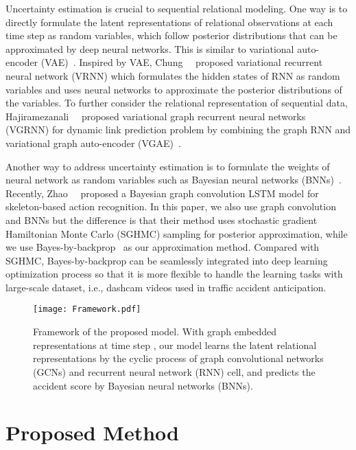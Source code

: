 \documentclass[sigconf]{acmart}
\begin{document}
Uncertainty estimation is crucial to sequential relational modeling. One way is to directly formulate the latent representations of relational observations at each time step as random variables, which follow posterior distributions that can be approximated by deep neural networks. This is similar to variational auto-encoder (VAE)~\cite{KingmaICLR2014,RezendeICML2014}. Inspired by VAE, Chung~\etal~\cite{ChungNIPS2015} proposed variational recurrent neural network (VRNN) which formulates the hidden states of RNN as random variables and uses neural networks to approximate the posterior distributions of the variables. To further consider the relational representation of sequential data, Hajiramezanali~\etal~\cite{HajiramezanaliNIPS2019} proposed variational graph recurrent neural networks (VGRNN) for dynamic link prediction problem by combining the graph RNN and variational graph auto-encoder (VGAE)~\cite{KipfNIPSW2016}.

Another way to address uncertainty estimation is to formulate the weights of neural network as random variables such as Bayesian neural networks (BNNs)~\cite{DenkerNIPS1990,NealBook2012}. Recently, Zhao~\etal~\cite{ZhaoICCV2019} proposed a Bayesian graph convolution LSTM model for skeleton-based action recognition. In this paper, we also use graph convolution and BNNs but the difference is that their method uses stochastic gradient Hamiltonian Monte Carlo (SGHMC) sampling for posterior approximation, while we use Bayes-by-backprop~\cite{BlundellJMLR2015} as our approximation method. Compared with SGHMC, Bayes-by-backprop can be seamlessly integrated into deep learning optimization process so that it is more flexible to handle the learning tasks with large-scale dataset, i.e., dashcam videos used in traffic accident anticipation.

\begin{figure}
    \centering
    \texttt{[image: Framework.pdf]}
    \caption{Framework of the proposed model. With graph embedded representations  at time step , our model learns the latent relational representations  by the cyclic process of graph convolutional networks (GCNs) and recurrent neural network (RNN) cell, and predicts the accident score  by Bayesian neural networks (BNNs).}
    \label{fig:framework}
\end{figure}

\section{Proposed Method}
\end{document}
